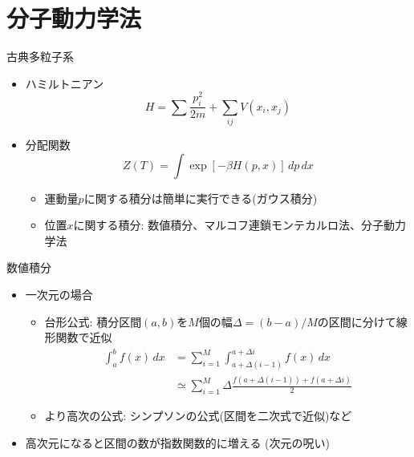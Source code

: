
\section{分子動力学法}

\begin{frame}[t,fragile]{古典多粒子系}
  \begin{itemize}
    \setlength{\itemsep}{1em}
  \item ハミルトニアン
    \[
    H = \sum \frac{p_i^2}{2m} + \sum_{ij} V(x_i, x_j)
    \]
  \item 分配関数
    \[
    Z(T) = \int \exp [- \beta H(p,x) ] \, dp \, dx
    \]
    \begin{itemize}
    \item 運動量$p$に関する積分は簡単に実行できる(ガウス積分)
    \item 位置$x$に関する積分: 数値積分、マルコフ連鎖モンテカルロ法、分子動力学法
    \end{itemize}
  \end{itemize}
\end{frame}

\begin{frame}[t,fragile]{数値積分}
  \begin{itemize}
    \setlength{\itemsep}{1em}
  \item 一次元の場合
    \begin{itemize}
    \item 台形公式: 積分区間$(a,b)$を$M$個の幅$\Delta=(b-a)/M$の区間に分けて線形関数で近似
      \begin{align*}
        \int_a^b f(x) \, dx &= \sum_{i=1}^M \int_{a+\Delta (i-1)}^{a+\Delta i} f(x) \, dx \\
        &\simeq \sum_{i=1}^M \Delta \frac{f({a+\Delta (i-1)}) + f({a+\Delta i})}{2}
      \end{align*}
    \item より高次の公式: シンプソンの公式(区間を二次式で近似)など
    \end{itemize}
    \item 高次元になると区間の数が指数関数的に増える (次元の呪い)
  \end{itemize}
\end{frame}

